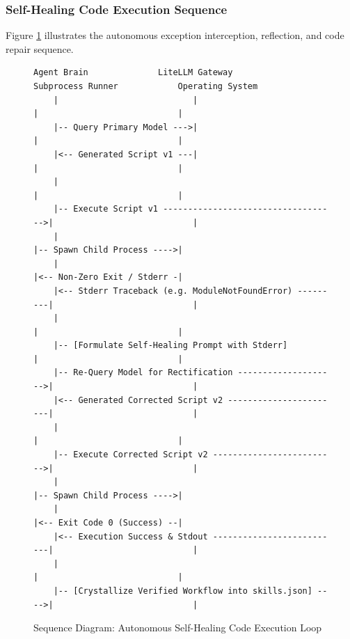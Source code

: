 \subsubsection{Self-Healing Code Execution Sequence}
Figure \ref{fig:seq_self_healing} illustrates the autonomous exception interception, reflection, and code repair sequence.

\begin{figure}[htbp]
\centering
{\scriptsize
\begin{verbatim}
Agent Brain              LiteLLM Gateway              Subprocess Runner            Operating System
    |                           |                             |                            |
    |-- Query Primary Model --->|                             |                            |
    |<-- Generated Script v1 ---|                             |                            |
    |                                                         |                            |
    |-- Execute Script v1 ----------------------------------->|                            |
    |                                                         |-- Spawn Child Process ---->|
    |                                                         |<-- Non-Zero Exit / Stderr -|
    |<-- Stderr Traceback (e.g. ModuleNotFoundError) ---------|                            |
    |                                                         |                            |
    |-- [Formulate Self-Healing Prompt with Stderr]           |                            |
    |-- Re-Query Model for Rectification -------------------->|                            |
    |<-- Generated Corrected Script v2 -----------------------|                            |
    |                                                         |                            |
    |-- Execute Corrected Script v2 ------------------------->|                            |
    |                                                         |-- Spawn Child Process ---->|
    |                                                         |<-- Exit Code 0 (Success) --|
    |<-- Execution Success & Stdout --------------------------|                            |
    |                                                         |                            |
    |-- [Crystallize Verified Workflow into skills.json] ---->|                            |
\end{verbatim}
}
\caption{Sequence Diagram: Autonomous Self-Healing Code Execution Loop}
\label{fig:seq_self_healing}
\end{figure}

